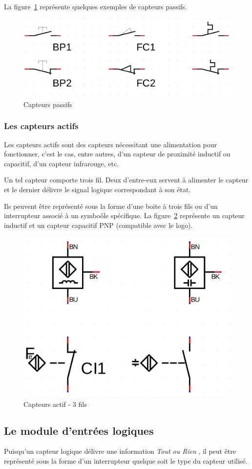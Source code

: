 \documentclass[11pt]{article}
\begin{document}
La figure~\ref{fig:captPassif} représente quelques exemples de capteurs passifs. 

\begin{figure}[h]
	\centering
	\includegraphics[width=.8\textwidth]{images/capteurPassifs.png}
	\caption{Capteurs passifs}
	\label{fig:captPassif}
\end{figure}


\subsubsection{Les capteurs actifs}
	Les capteurs actifs sont des capteurs nécessitant une alimentation pour fonctionner, c'est le cas, entre autres, d'un capteur de proximité inductif ou capacitif, d'un capteur infrarouge, etc. 

	Un tel capteur comporte trois fil. Deux d'entre-eux servent à alimenter le capteur et le dernier délivre le signal logique correspondant à son état. 

	Ils peuvent être représenté sous la forme d'une boite à trois fils ou d'un interrupteur associé à un symboôle spécifique. La figure~\ref{fig:captActif} représente un capteur inductif et un capteur capacitif PNP (compatible avec le logo). 
\begin{figure}
	\centering
	\includegraphics[width=.4\textwidth]{images/captActifs.png}
	\caption{Capteurs actif - 3 fils}
	\label{fig:captActif}
\end{figure}

\subsection{Le module d'entrées logiques}
Puisqu'un capteur logique délivre une information \textit{Tout ou Rien} , il peut être représenté sous la forme d'un interrupteur quelque soit le type du capteur utilisé. 
\end{document}
